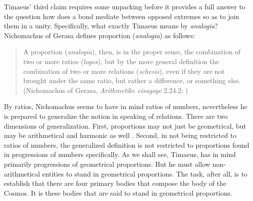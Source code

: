 Timaeus' third claim requires some unpacking before it provides a full answer to the question how does a bond mediate between opposed extremes so as to join them in a unity. Specifically, what exactly Timaeus means by \emph{analogia}? Nichomachus of Gerasa defines proportion (\emph{analogia}) as follows:
\begin{quote}
	A proportion (\emph{analogia}), then, is in the proper sense, the combination of two or more ratios (\emph{logos}), but by the more general definition the combination of two or more relations (\emph{schesis}), even if they are not brought under the same ratio, but rather a difference, or something else. (Nichomachus of Gerasa, \emph{Arithmetike eisagoge} 2.24.2; \citealt[264--5]{Dooge:1926aa})
\end{quote}
By ratios, Nichomachus seems to have in mind ratios of numbers, nevertheless he is prepared to generalize the notion in speaking of relations. There are two dimensions of generalization. First, proportions may not just be geometrical, but may be arithmetical and harmonic as well \citep[264 n2]{Dooge:1926aa}. Second, in not being restricted to ratios of numbers, the generalized definition is not restricted to proportions found in progressions of numbers specifically. As we shall see, Timaeus, has in mind primarily progressions of geometrical proportions. But he must allow non-arithmetical entities to stand in geometrical proportions. The task, after all, is to establish that there are four primary bodies that compose the body of the Cosmos. It is these bodies that are said to stand in geometrical proportions.

